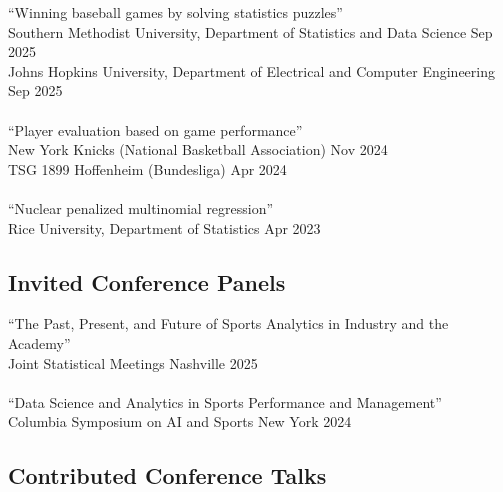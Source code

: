 \documentclass{article}
\begin{document}
``Winning baseball games by solving statistics puzzles''\\
Southern Methodist University, Department of Statistics and Data Science \hfill Sep 2025\\
Johns Hopkins University, Department of Electrical and Computer Engineering \hfill Sep 2025\\
~\\
``Player evaluation based on game performance''\\
New York Knicks (National Basketball Association) \hfill Nov 2024\\
TSG 1899 Hoffenheim (Bundesliga) \hfill Apr 2024\\
~\\
``Nuclear penalized multinomial regression''\\
Rice University, Department of Statistics \hfill Apr 2023

\subsection*{\sc Invited Conference Panels}

``The Past, Present, and Future of Sports Analytics in Industry and the Academy''\\
Joint Statistical Meetings \hfill Nashville 2025\\
~\\
``Data Science and Analytics in Sports Performance and Management''\\
Columbia Symposium on AI and Sports \hfill New York 2024

\subsection*{\sc Contributed Conference Talks}
\end{document}
